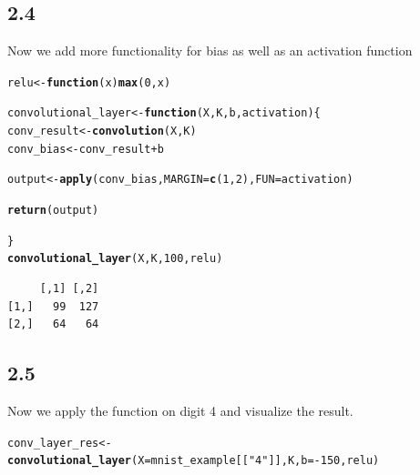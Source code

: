 \documentclass[10pt, a4paper, english]{article}\usepackage[]{graphicx}\usepackage[dvipsnames]{xcolor}
\makeatletter
\newcommand{\hlnum}[1]{\textcolor[rgb]{0.686,0.059,0.569}{#1}}%
\newcommand{\hlstr}[1]{\textcolor[rgb]{0.192,0.494,0.8}{#1}}%
\newcommand{\hlopt}[1]{\textcolor[rgb]{0,0,0}{#1}}%
\newcommand{\hlstd}[1]{\textcolor[rgb]{0.345,0.345,0.345}{#1}}%
\newcommand{\hlkwa}[1]{\textcolor[rgb]{0.161,0.373,0.58}{\textbf{#1}}}%
\newcommand{\hlkwb}[1]{\textcolor[rgb]{0.69,0.353,0.396}{#1}}%
\newcommand{\hlkwc}[1]{\textcolor[rgb]{0.333,0.667,0.333}{#1}}%
\newcommand{\hlkwd}[1]{\textcolor[rgb]{0.737,0.353,0.396}{\textbf{#1}}}%
\newenvironment{kframe}{%
 \def\at@end@of@kframe{}%
 \ifinner\ifhmode%
  \def\at@end@of@kframe{\end{minipage}}%
  \begin{minipage}{\columnwidth}%
 \fi\fi%
 \def\FrameCommand##1{\hskip\@totalleftmargin \hskip-\fboxsep
 \colorbox{shadecolor}{##1}\hskip-\fboxsep
     \hskip-\linewidth \hskip-\@totalleftmargin \hskip\columnwidth}%
 \MakeFramed {\advance\hsize-\width
   \@totalleftmargin\z@ \linewidth\hsize
   \@setminipage}}%
 {\par\unskip\endMakeFramed%
 \at@end@of@kframe}
\newenvironment{knitrout}{}{} %
\makeatother
\begin{document}
\subsection{2.4}
Now we add more functionality for bias as well as an activation function
\begin{knitrout}
\color{fgcolor}\begin{kframe}
\begin{alltt}
\hlstd{relu} \hlkwb{<-} \hlkwa{function}\hlstd{(}\hlkwc{x}\hlstd{)} \hlkwd{max}\hlstd{(}\hlnum{0}\hlstd{, x)}

\hlstd{convolutional_layer} \hlkwb{<-} \hlkwa{function}\hlstd{(}\hlkwc{X}\hlstd{,} \hlkwc{K}\hlstd{,} \hlkwc{b}\hlstd{,} \hlkwc{activation}\hlstd{)\{}
  \hlstd{conv_result} \hlkwb{<-} \hlkwd{convolution}\hlstd{(X,K)}
  \hlstd{conv_bias} \hlkwb{<-} \hlstd{conv_result} \hlopt{+} \hlstd{b}

  \hlstd{output} \hlkwb{<-}\hlkwd{apply}\hlstd{(conv_bias,} \hlkwc{MARGIN} \hlstd{=} \hlkwd{c}\hlstd{(}\hlnum{1}\hlstd{,} \hlnum{2}\hlstd{),} \hlkwc{FUN} \hlstd{= activation)}


  \hlkwd{return}\hlstd{(output)}

  \hlstd{\}}
\hlkwd{convolutional_layer}\hlstd{(X, K,} \hlnum{100}\hlstd{, relu)}
\end{alltt}
\begin{verbatim}
     [,1] [,2]
[1,]   99  127
[2,]   64   64
\end{verbatim}
\end{kframe}
\end{knitrout}

\subsection{2.5}
Now we apply the function on digit 4 and visualize the result.
\begin{knitrout}
\color{fgcolor}\begin{kframe}
\begin{alltt}
\hlstd{conv_layer_res} \hlkwb{<-} \hlkwd{convolutional_layer}\hlstd{(}\hlkwc{X}\hlstd{= mnist_example[[}\hlstr{"4"}\hlstd{]], K,} \hlkwc{b}\hlstd{=} \hlopt{-}\hlnum{150}\hlstd{, relu)}
\end{alltt}
\end{kframe}
\end{knitrout}
\end{document}
